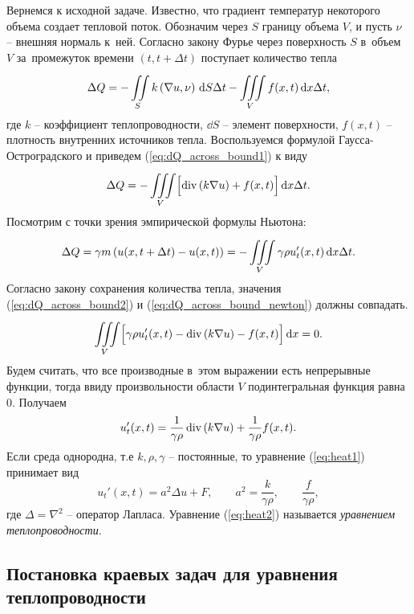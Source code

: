 Вернемся к исходной задаче. Известно, что градиент температур некоторого объема создает тепловой поток. Обозначим через $S$ границу объема $V$, и пусть $\nu$ -- внешняя нормаль к~ней.
Согласно закону Фурье через поверхность $S$ в~объем $V$ за~промежуток времени $(t,t+\Delta t)$ поступает количество тепла
\begin{equation}\label{eq:dQ_across_bound1}
	\Delta Q = - \iint\limits_{S}^{}  k \left( \nabla u, \nu \right)  \,\mathrm{d}{S}\Delta t - \iiint\limits_{V}^{}  f(x,t)  \,\mathrm{d}{x}\Delta t,
\end{equation}
где $k$ -- коэффициент теплопроводности, $\dd S$ -- элемент поверхности, $f(x,t)$ -- плотность внутренних источников тепла.
Воспользуемся формулой Гаусса-Остроградского и приведем (\ref{eq:dQ_across_bound1}) к виду
\begin{equation}\label{eq:dQ_across_bound2}
	\Delta Q = -\iiint\limits_{V}^{}  \Bigl[  \operatorname{div}{(k \nabla u)} + f(x,t) \Bigr]  \,\mathrm{d}{x}\Delta t.
\end{equation}
Посмотрим с точки зрения эмпирической формулы Ньютона:
\begin{equation}\label{eq:dQ_across_bound_newton}
	\Delta Q = \gamma m \left( u(x,t+\Delta t) - u(x,t) \right) = - \iiint\limits_{V}^{}  \gamma \rho u_t'(x,t)  \,\mathrm{d}{x}\Delta t.
\end{equation}
Согласно закону сохранения количества тепла, значения (\ref{eq:dQ_across_bound2}) и (\ref{eq:dQ_across_bound_newton}) должны совпадать.
$$
	\iiint\limits_{V}^{}  \Bigl[ \gamma \rho u_t'(x,t) - \operatorname{div}{(k \nabla u)} - f(x,t) \Bigr]  \,\mathrm{d}{x} = 0.
$$
Будем считать, что все производные в~этом выражении есть непрерывные функции, тогда ввиду произвольности области $V$ подинтегральная функция равна 0.
Получаем 
\begin{equation}\label{eq:heat1}
	u_t'(x,t) = \frac{1}{\gamma\rho}\operatorname{div}{(k \nabla u)} + \frac{1}{\gamma\rho}f(x,t).
\end{equation}
Если среда однородна, т.е $k,\rho,\gamma$ -- постоянные, то уравнение (\ref{eq:heat1}) принимает вид
\begin{equation}\label{eq:heat2}
	u_t'(x,t) = a^2 \Delta u + F, \qquad a^2 = \frac{k}{\gamma\rho}, \qquad \frac{f}{\gamma\rho},
\end{equation}
где $\Delta = \nabla^2$ -- оператор Лапласа.
Уравнение (\ref{eq:heat2}) называется \emph{уравнением теплопроводности}.

\subsection{Постановка краевых задач для уравнения теплопроводности}

